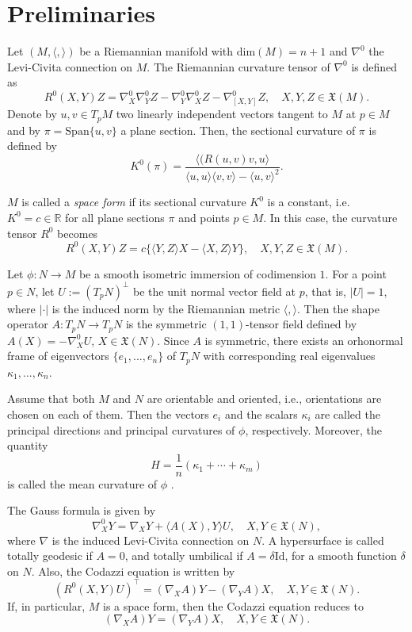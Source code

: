 \documentclass[12pt]{amsart}
\def\r{\mathbb R}
\def\x{\mathfrak X}
\theoremstyle{definition}
\begin{document}
\section{Preliminaries} \label{pre}

Let $(M,\langle,\rangle)$ be a Riemannian manifold with $\mbox{dim}(M)=n+1$ and $\nabla^0$ the Levi-Civita connection on $M$. The Riemannian curvature tensor of $\nabla^0$ is defined as
$$
R^0(X,Y)Z=\nabla^0_X\nabla^0_YZ-\nabla^0_Y\nabla^0_XZ-\nabla^0_{[X,Y]}Z, \quad X,Y,Z \in \x(M).
$$
Denote by $u,v\in T_pM$ two linearly independent vectors tangent to $M$ at $p \in M$ and by $\pi=\text{Span}\{u,v\}$ a plane section. Then, the sectional curvature of $\pi$ is defined by
$$
K^0(\pi)=\frac{\langle(R(u,v)v,u\rangle}{\langle u,u\rangle \langle v,v\rangle-\langle u,v\rangle^2}.
$$

$M$ is called a {\it space form} if its sectional curvature $K^0$ is a constant, i.e. $K^0=c\in \r$ for all plane sections $\pi$ and points $p \in M$. In this case, the curvature tensor $R^0$ becomes
$$
R^0(X,Y)Z=c\{\langle Y,Z\rangle X-\langle X,Z\rangle Y\}, \quad  X,Y,Z \in \x(M).
$$

Let $\phi:N\to M$ be a smooth isometric immersion of codimension $1$. For a point $p\in N$, let $U:=(T_pN)^\perp$ be the unit normal vector field at $p$, that is, $|U|=1$, where $|\cdot|$ is the induced norm by the Riemannian metric $\langle , \rangle$. Then the shape operator $A:T_pN \to T_pN$ is the symmetric $(1,1)$-tensor field defined by $A(X)=-\nabla^0_X U$, $X\in \x(N)$. Since $A$ is symmetric, there exists an orhonormal frame of eigenvectors $\{e_1,...,e_n\}$ of $T_pN$ with corresponding real eigenvalues $\kappa_1,...,\kappa_n$. 

Assume that both $M$ and $N$ are orientable and oriented, i.e., orientations are chosen on each of them. Then the vectors $e_i$ and the scalars $\kappa_i$ are called the principal directions and principal curvatures of $\phi$, respectively. Moreover, the quantity 
$$H=\frac{1}{n}(\kappa_1+\cdots+\kappa_m)$$ is called the mean curvature of $\phi$ \cite{car}.

The Gauss formula is given by
$$
\nabla^0_XY=\nabla_XY+\langle A(X),Y\rangle U, \quad X,Y \in\x(N),
$$
where $\nabla$ is the induced Levi-Civita connection on $N$. A hypersurface is called totally geodesic if $A=0$, and totally umbilical if $A=\delta \mbox{Id}$, for a smooth function $\delta$ on $N$. Also, the Codazzi equation is written by
$$
(R^0(X,Y)U)^{\top}=(\nabla_XA)Y-(\nabla_YA)X, \quad X,Y \in \x(N).
$$
If, in particular, $M$ is a space form, then the Codazzi equation reduces to 
$$(\nabla_XA)Y=(\nabla_YA)X, \quad X,Y \in \x(N).$$
\end{document}

